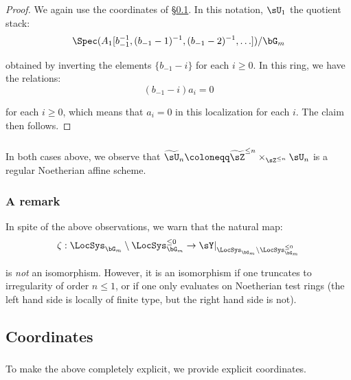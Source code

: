 \begin{proof}

We again use the coordinates of \S \ref{ss:coords}.
In this notation, $\sU_1$ the quotient stack:
%
\[
\Spec(A_1[b_{-1}^{-1},(b_{-1}-1)^{-1},(b_{-1}-2)^{-1},\ldots])/\bG_m
\]

 obtained by inverting the elements $\{b_{-1}-i\}$ for each $i \geq 0$.
In this ring, we have the relations:
%
\[
(b_{-1}-i)a_i = 0
\]

 for each $i \geq 0$, which means that $a_i = 0$ in this localization
for each $i$. The claim then follows.

\end{proof}

\subsubsection{}\label{sss:u-reg-noeth}

In both cases above, we observe that $\widetilde{\sU}_n \coloneqq
\widetilde{\sZ}^{\leq n} \times_{\sZ^{\leq n}} \sU_n$ is a regular Noetherian
affine scheme.

\subsubsection{A remark}

In spite of the above observations, we warn that the natural map:
%
\[
\zeta: \LocSys_{\bG_m} \setminus \LocSys_{\bG_m}^{\leq 0} \to
\sY|_{\LocSys_{\bG_m} \setminus \LocSys_{\bG_m}^{\leq 0}}
\]

 is \emph{not} an isomorphism. However, it is an isomorphism
if one truncates to irregularity of order $n \leq 1$,
or if one only evaluates on Noetherian
test rings (the left hand side is locally of finite type,
but the right hand side is not).

\subsection{Coordinates}\label{ss:coords}

\subsubsection{}

To make the above completely explicit, we provide explicit
coordinates.

\subsubsection{}

